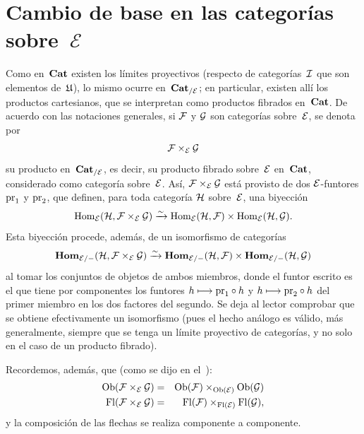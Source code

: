 \section{Cambio de base en las categorías sobre~$\mathcal{E}$}
\label{VI.3}

Como en~$\Cat$ existen los límites proyectivos (respecto de categorías~$\cal{I}$
que son elementos de~$\Univ$), lo mismo ocurre en~$\Cat_{/\cal{E}}$; en
particular, existen allí los productos cartesianos, que se interpretan como
productos fibrados en~$\Cat$. De acuerdo con las notaciones generales, si
$\cal{F}$ y $\cal{G}$ son categorías sobre~$\cal{E}$, se denota por
$$
\cal{F}\times_{\cal{E}}\cal{G}
$$
\label{indnot:fk}%
su producto en~$\Cat_{/\cal{E}}$, es decir, su producto fibrado sobre~$\cal{E}$
en~$\Cat$,
considerado como categoría sobre~$\cal{E}$. Así,
$\cal{F}\times_{\cal{E}}\cal{G}$ está provisto de dos $\cal{E}$-funtores
$\pr_1$ y $\pr_2$, que definen, para toda categoría $\cal{H}$ sobre~$\cal{E}$,
una biyección
$$
\Hom_{\cal{E}}(\cal{H},\cal{F}\times_{\cal{E}}\cal{G})\isomto
\Hom_{\cal{E}}(\cal{H},\cal{F})\times\Hom_{\cal{E}}(\cal{H},\cal{G}).
$$
Esta biyección procede, además, de un isomorfismo de categorías
$$
\SheafHom_{\cal{E}/-}(\cal{H},\cal{F}\times_{\cal{E}}
\cal{G})\isomto\SheafHom_{\cal{E}/-}(\cal{H},\cal{F})\times
\SheafHom_{\cal{E}/-}(\cal{H},\cal{G})
$$
al tomar los conjuntos de objetos de ambos miembros, donde el funtor escrito es
el que tiene por componentes los funtores $h\mto\pr_1\circ h$ y
$h\mto\pr_2\circ h$ del primer miembro en los dos factores del segundo. Se
deja al lector comprobar que se obtiene efectivamente un isomorfismo (pues el
hecho análogo es válido, más generalmente, siempre que se tenga un límite
proyectivo de categorías, y no solo en el caso de un producto fibrado).

Recordemos, además, que (como se dijo en el~\No {}):
\begin{eqnarray*}
\Ob(\cal{F}\times_\cal{E}\cal{G})&=&
\Ob(\cal{F})\times_{\Ob(\cal{E})}\Ob(\cal{G})\\
\Fl(\cal{F}\times_\cal{E}\cal{G})&=&
\Fl(\cal{F})\times_{\Fl(\cal{E})}\Fl(\cal{G})\quoi,
\end{eqnarray*}
y la composición de las flechas se realiza componente a componente.

